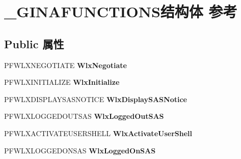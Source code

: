 \hypertarget{struct___g_i_n_a_f_u_n_c_t_i_o_n_s}{}\section{\+\_\+\+G\+I\+N\+A\+F\+U\+N\+C\+T\+I\+O\+N\+S结构体 参考}
\label{struct___g_i_n_a_f_u_n_c_t_i_o_n_s}
\subsection*{Public 属性}
\begin{DoxyCompactItemize}
\item 
\mbox{\label{struct___g_i_n_a_f_u_n_c_t_i_o_n_s_a7f6616bd5adec301b1a812d6bd851aa5}} 
P\+F\+W\+L\+X\+N\+E\+G\+O\+T\+I\+A\+TE {\bfseries Wlx\+Negotiate}
\item 
\mbox{\label{struct___g_i_n_a_f_u_n_c_t_i_o_n_s_a3bb529064c6f076f29c7c6c7170fd33f}} 
P\+F\+W\+L\+X\+I\+N\+I\+T\+I\+A\+L\+I\+ZE {\bfseries Wlx\+Initialize}
\item 
\mbox{\label{struct___g_i_n_a_f_u_n_c_t_i_o_n_s_ae6283d2b7b95b1393e8b0b2806afaf95}} 
P\+F\+W\+L\+X\+D\+I\+S\+P\+L\+A\+Y\+S\+A\+S\+N\+O\+T\+I\+CE {\bfseries Wlx\+Display\+S\+A\+S\+Notice}
\item 
\mbox{\label{struct___g_i_n_a_f_u_n_c_t_i_o_n_s_a2b32a9f13330883cc27be1ee84ba001b}} 
P\+F\+W\+L\+X\+L\+O\+G\+G\+E\+D\+O\+U\+T\+S\+AS {\bfseries Wlx\+Logged\+Out\+S\+AS}
\item 
\mbox{\label{struct___g_i_n_a_f_u_n_c_t_i_o_n_s_af418bb6039234d723469fd4adad52636}} 
P\+F\+W\+L\+X\+A\+C\+T\+I\+V\+A\+T\+E\+U\+S\+E\+R\+S\+H\+E\+LL {\bfseries Wlx\+Activate\+User\+Shell}
\item 
\mbox{\label{struct___g_i_n_a_f_u_n_c_t_i_o_n_s_a4d6b2a5b8377db43425d587dc00a3bf8}} 
P\+F\+W\+L\+X\+L\+O\+G\+G\+E\+D\+O\+N\+S\+AS {\bfseries Wlx\+Logged\+On\+S\+AS}
\item 
\mbox{\label{struct___g_i_n_a_f_u_n_c_t_i_o_n_s_afe022f98c31a6c1cb45ca3a6529b2ef8}} 

\end{DoxyCompactItemize}
